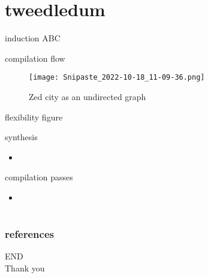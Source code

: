 \documentclass[aspectratio=1610]{beamer}
\begin{document}
\section{tweedledum}
\begin{frame}{induction}  
  ABC 
\end{frame}
\begin{frame}{compilation flow}
  \begin{figure}[htbq]
    \centering
    \texttt{[image: Snipaste\_2022-10-18\_11-09-36.png]}
    \caption{Zed city as an undirected graph} 
    \label{dataset}
  \end{figure}
\end{frame}
\begin{frame}{flexibility}
  figure
\end{frame}
\begin{frame}{synthesis}
  \begin{itemize}
    \item 
  \end{itemize}  
\end{frame}
\begin{frame}{compilation passes}
  \begin{itemize}
    \item 
  \end{itemize}
\end{frame}
\section*{}
\begin{frame}
	\frametitle{references}
	\printbibliography
\end{frame}
\begin{frame}
\centering
\Huge{END\\Thank you}
\end{frame}
\end{document}
